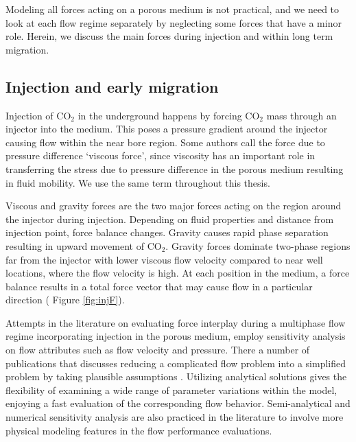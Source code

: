 Modeling all forces acting on a porous medium is not practical, and we need to look at each flow regime separately by neglecting some forces that have a minor role. Herein, we discuss the main forces during injection and within long term migration.


\subsection{Injection and early migration}

Injection of $\mbox{CO}_2$ in the underground happens by forcing $\mbox{CO}_2$
mass through an injector into the medium. This poses a pressure gradient around the injector causing flow within the near bore region. Some authors call the force due to pressure difference `viscous force', since viscosity has an important role in transferring the stress due to pressure difference in the porous medium resulting in fluid mobility. We use the same term throughout this thesis. 

Viscous and gravity forces are the two major forces acting on the region around the injector during injection. Depending on fluid properties and distance from injection point, force balance changes. Gravity causes rapid phase
separation resulting in upward movement of $\mbox{CO}_2$. Gravity forces
dominate two-phase regions far from the injector with lower viscous flow velocity compared to near well locations, where the flow velocity is high. At each position in the medium, a force balance results in a total force vector that may cause flow in a particular direction ( Figure \ref{fig:injF}).

Attempts in the literature on evaluating force interplay during a multiphase
flow regime incorporating injection in the porous medium, employ sensitivity
analysis on flow attributes such as flow velocity and pressure. There a number of publications that discusses reducing a complicated flow problem into a simplified problem by taking plausible assumptions \cite{fayers1959effect,dong1999effect,nordbotten2005injection,
yortsos1983analytical,rapoport1953properties,farajzadeh2011analytical,
yang1992analytical,chen1990integral,bentsen1993effect}. Utilizing analytical
solutions gives the flexibility of examining a wide range of parameter
variations within the model, enjoying a fast evaluation of the
corresponding flow behavior. Semi-analytical and numerical sensitivity analysis
are also practiced in the literature to involve more physical modeling
features in the flow performance
evaluations\cite{rosado2007analysis,allen1986theoretical,alkan2010impact}.



